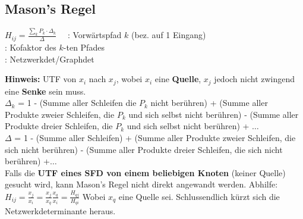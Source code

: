\subsection{Mason's Regel }
	\begin{multicols}{2}
		$\boxed{H_{ij} = \frac{\sum\limits_k P_k\cdot\Delta_k}{\Delta}}\quad$ 
		\vfill
		\columnbreak
		\vfill
		: Vorwärtspfad $k$ (bez. auf 1 Eingang) \enspace \\
		: Kofaktor des $k$-ten Pfades \enspace \\
		\boldmath{$\Delta$}: Netzwerkdet/Graphdet\vspace{0.3cm}
		\vfill
		\columnbreak
		\vfill
	\end{multicols}
	\textbf{Hinweis:} UTF von $x_i$ nach $x_j$, wobei \textbf{$x_i$} eine
	\textbf{Quelle}, \textbf{$x_j$} jedoch nicht zwingend eine \textbf{Senke} sein
	muss. \vspace{0.3cm}\\
	\boldmath$\Delta_k$ = 1 - (Summe aller Schleifen die $P_k$ nicht berühren) + (Summe aller Produkte zweier Schleifen, die $P_k$ und sich selbst nicht
	berühren) - (Summe aller Produkte dreier Schleifen, die $P_k$ und sich selbst
	nicht berühren) + \unboldmath $\ldots$\vspace{0.3cm} \\
	\boldmath$\Delta$ = 1 - (Summe aller Schleifen) + (Summe aller Produkte zweier
	Schleifen, die sich nicht berühren) - (Summe
	aller Produkte dreier Schleifen, die sich nicht berühren) +\unboldmath$\ldots$ \\
	
	Falls die \textbf{UTF eines SFD von einem beliebigen Knoten} (keiner Quelle)
	gesucht wird, kann Mason's Regel nicht direkt angewandt werden. Abhilfe: \\
	$\boxed{H_{ij} = \frac{x_j}{x_i} = \frac{x_j}{x_q} \frac{x_q}{x_i} =
	\frac{H_{qj}}{H_{qi}}}$ Wobei $x_q$ eine Quelle sei. 
	Schlussendlich kürzt sich die Netzwerkdeterminante heraus. \\

